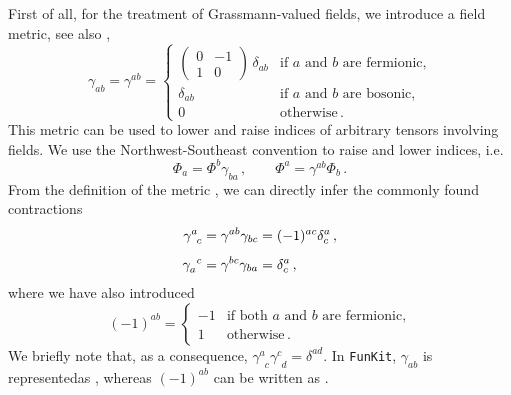 \documentclass[10pt,prd,nofootinbib,superscriptaddress,twocolumn]{revtex4-2}
\newcommand{\FunKit}{\texttt{FunKit}\xspace}
\begin{document}
First of all, for the treatment of Grassmann-valued fields, we introduce a field metric, see also \cite{Pawlowski:2005xe, Braun:2025gvq},
%
\begin{equation}\label{eq:metric}
	\gamma_{ab} = \gamma^{ab} = \begin{cases}
		\begin{pmatrix}
			0 & -1 \\
			1 & 0
		\end{pmatrix}\,\delta_{ab}
		& \text{if $a$ and $b$ are fermionic,} \\[3ex]
		\delta_{ab} & \text{if $a$ and $b$ are bosonic,}   \\[2ex]
		0               & \text{otherwise} 
		\,.
	\end{cases}
\end{equation}
%
This metric can be used to lower and raise indices of arbitrary tensors involving fields. We use the Northwest-Southeast convention to raise and lower indices, i.e.
%
\begin{equation}
	\Phi_a = \Phi^b\gamma_{ba} \,,
	\quad \quad
	\Phi^a = \gamma^{ab}\Phi_b \,.
\end{equation}
%
From the definition of the metric , we can directly infer the commonly found contractions
%
\begin{align}
	\gamma^{a}_{\phantom{a}c} &= \gamma^{ab}\gamma_{bc} = (-1)^{ac}\delta^a_c
	\,,\notag\\[1ex]
	\gamma_{a}^{\phantom{a}c} &= \gamma^{bc}\gamma_{ba} = \delta^a_c
	\,,
\end{align}
%
where we have also introduced
%
\begin{equation}
	(-1)^{ab} = \begin{cases}
		-1 & \text{if both $a$ and $b$ are fermionic,} \\[1ex]
		1 & \text{otherwise} 
		\,.
	\end{cases}
\end{equation}
%
We briefly note that, as a consequence, $\gamma^{a}_{\phantom{a}c}\gamma^{c}_{\phantom{c}d} = \delta^{ad}$.
In \FunKit, $\gamma_{ab}$ is represented\linebreak as , whereas $(-1)^{ab}$ can be written as .
\end{document}
